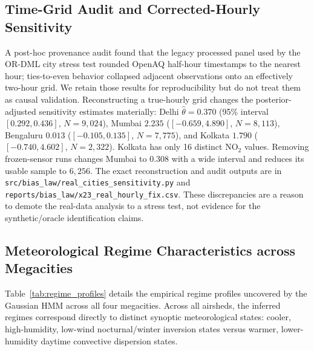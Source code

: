 \documentclass[twoside]{article}
\theoremstyle{definition}
\begin{document}
\subsection{Time-Grid Audit and Corrected-Hourly Sensitivity}
A post-hoc provenance audit found that the legacy processed panel used by the OR-DML city stress test rounded OpenAQ half-hour timestamps to the nearest hour; ties-to-even behavior collapsed adjacent observations onto an effectively two-hour grid. We retain those results for reproducibility but do not treat them as causal validation. Reconstructing a true-hourly grid changes the posterior-adjusted sensitivity estimates materially: Delhi $\hat\theta=0.370$ (95\% interval $[0.292,0.436]$, $N=9{,}024$), Mumbai $2.235$ ($[-0.659,4.890]$, $N=8{,}113$), Bengaluru $0.013$ ($[-0.105,0.135]$, $N=7{,}775$), and Kolkata $1.790$ ($[-0.740,4.602]$, $N=2{,}322$). Kolkata has only 16 distinct $\mathrm{NO}_2$ values. Removing frozen-sensor runs changes Mumbai to $0.308$ with a wide interval and reduces its usable sample to $6{,}256$. The exact reconstruction and audit outputs are in \texttt{src/bias\_law/real\_cities\_sensitivity.py} and \texttt{reports/bias\_law/x23\_real\_hourly\_fix.csv}. These discrepancies are a reason to demote the real-data analysis to a stress test, not evidence for the synthetic/oracle identification claims.


\subsection{Meteorological Regime Characteristics across Megacities}
\label{app:regime_profiles}
Table~\ref{tab:regime_profiles} details the empirical regime profiles uncovered by the Gaussian HMM across all four megacities. Across all airsheds, the inferred regimes correspond directly to distinct synoptic meteorological states: cooler, high-humidity, low-wind nocturnal/winter inversion states versus warmer, lower-humidity daytime convective dispersion states.
\end{document}
